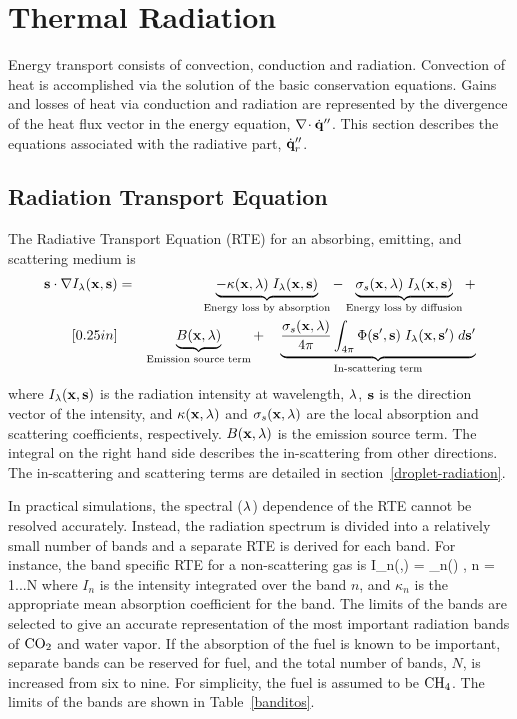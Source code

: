 
\chapter{Thermal Radiation}
\label{chapter:radiation}

Energy transport consists of convection, conduction and
radiation. Convection of heat is accomplished via the solution of the
basic conservation equations. Gains and losses of heat via conduction
and radiation are represented by the divergence of the heat flux
vector in the energy equation, $\nabla\!\cdot \dot{\bf q}''$. This section
describes the equations associated with the radiative part, $\dot{\bf q}''_r$.

\section{Radiation Transport Equation}

The Radiative Transport Equation (RTE) for an absorbing, emitting, and scattering medium is
\begin{eqnarray}
{\bf s} \cdot \nabla I_{\lambda}({\bf x},{\bf s}) &=&
\underbrace{ - \kappa({\bf x},\lambda)   \; I_\lambda({\bf x},{\bf s}) }_{\textrm{Energy loss by absorption}} -
\underbrace{\sigma_s({\bf x},\lambda) \; I_\lambda({\bf x},{\bf s}) }_{\textrm{Energy loss by diffusion}} +  \nonumber  \\ [0.25in]
& & \underbrace{   B({\bf x},\lambda) }_{\textrm{Emission source term}} + \quad
\underbrace{   \frac{\sigma_s({\bf x},\lambda)}{4\pi}
\int_{4\pi}\Phi({\bf s}',{\bf s}) \; I_{\lambda}({\bf x},{\bf s}') \; d{\bf s}'
 }_{\textrm{In-scattering term}}
\label{RTEbasic}
\end{eqnarray}
where $I_{\lambda}({\bf x},{\bf s})$ is the radiation intensity at wavelength,
$\lambda$, ${\bf s}$ is the direction vector of the intensity, and
$\kappa({\bf x},\lambda)$ and $\sigma_s({\bf x},\lambda)$ are the local absorption
and scattering coefficients,
respectively. $B({\bf x},\lambda)$ is the emission source term.
The integral on the
right hand side describes the in-scattering from other directions. The in-scattering and scattering terms are detailed in section~\ref{droplet-radiation}.

In practical simulations, the spectral ($\lambda$) dependence of the RTE cannot be resolved
accurately. Instead, the radiation spectrum is divided into
a relatively small number of bands and a separate RTE is derived for
each band. For instance, the band specific RTE for a non-scattering gas is
\be   \bs \cdot \nabla I_n(\bx,\bs) = \kappa_n(\bx) \;
        \left[ I_{b,n}(\bx) - I_n(\bx,\bs) \right],\;\; n = 1...N
\label{bandRTE} \ee
where $I_n$ is the intensity integrated over the band $n$, and $\kappa_n$
is the appropriate mean absorption coefficient for the band.
The limits of the bands are selected to give an accurate
representation of the most important radiation bands of $\rm CO_2$ and
water vapor. If the absorption of the fuel is known to be important,
separate bands can be reserved for fuel, and the total number of
bands, $N$, is increased from six to nine.
For simplicity, the fuel is assumed to be $\rm CH_4$.
The limits of the bands are shown in Table~\ref{banditos}.

